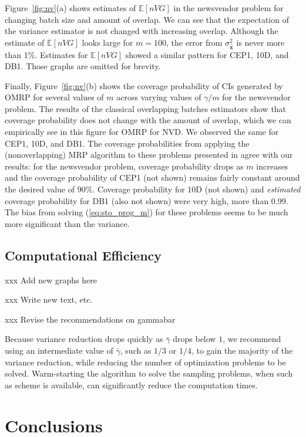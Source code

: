 \documentclass[12pt]{article}
\newcommand{\e}[1]{\mathbb{E} \left[ #1 \right]
}
\newcommand{\x}{\mathbf{x}}
\newcommand{\xh}{{\hat{\x}}}
\newcommand{\gammab}{\bar{\gamma}}
\begin{document}
Figure~\ref{fig:nv}(a) shows estimates of $\e{nVG}$ in the newsvendor problem for changing batch size and amount of overlap. 
We can see that the expectation of the variance estimator is not changed with increasing overlap. 
Although the estimate of $\e{nVG}$ looks large for $m=100$, the error from $\sigma^2_\xh$ is never more than 1\%.  
Estimates for $\e{nVG}$ showed a similar pattern for CEP1, 10D, and DB1.  
Those graphs are omitted for brevity.

Finally, Figure~\ref{fig:nv}(b) shows the coverage probability of CIs generated by OMRP for several values of $m$ across varying values of $\gamma/m$ for the newsvendor problem.  
The results of the classical overlapping batches estimators show that coverage probability does not change with the amount of overlap, which we can  empirically see in this figure for OMRP for NVD.
We observed the same for CEP1, 10D, and DB1.  
The coverage probabilities from applying the (nonoverlapping) MRP algorithm to these problems presented in \citep{Bayraksan2006} agree with our results: for the newsvendor problem, coverage probability drops as $m$ increases and the coverage probability of CEP1 (not shown) remains fairly constant around the desired value of $90\%$. 
Coverage probability for 10D (not shown) and {\it estimated} coverage probability for DB1 (also not shown) were very high, more than $0.99$.  
The bias from solving (\ref{eq:sto_prog_m}) for these problems seems to be much more significant than the variance.

\subsection{Computational Efficiency}
\label{ssec:compeff}

xxx Add new graphs here \bigskip 

xxx Write new text, etc. \bigskip 

xxx Revise the recommendations on gammabar \bigskip 

Because variance reduction drops quickly as $\gammab$ drops below $1$, we recommend using an intermediate value of $\gammab$, such as $1/3$ or $1/4$, to gain the majority of the variance reduction, while reducing the number of optimization problems to be solved. 
Warm-starting the algorithm to solve the sampling problems, when such as scheme is available, can significantly reduce the computation times.

\section{Conclusions}
\label{sec:concl}
\end{document}
